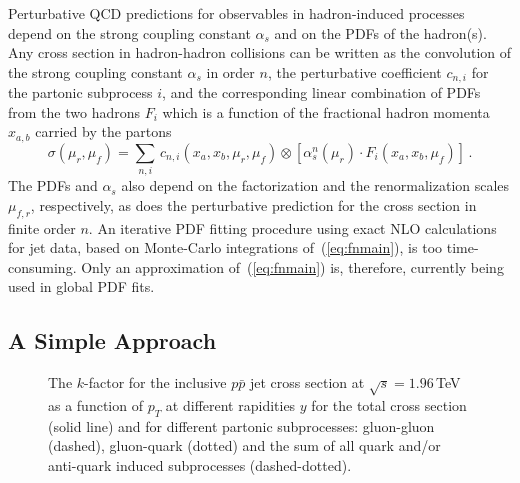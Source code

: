 Perturbative QCD predictions for observables in 
hadron-induced processes depend on the strong coupling 
constant $\alpha_s$ and on the PDFs of the hadron(s).
Any cross section in hadron-hadron collisions 
can be written as the convolution of 
the strong coupling constant  $\alpha_s$ in order $n$,
the perturbative coefficient $c_{n,i}$ for the partonic
subprocess $i$,
and the corresponding linear combination of PDFs 
from the two hadrons $F_i$
which is a function of the  fractional hadron momenta
$x_{a,b}$ carried by the partons
%
\begin{equation}
\sigma(\mu_r,\mu_f) = \sum_{n,i}  \, c_{n,i}(x_a, x_b, \mu_r,\mu_f) 
\otimes 
\left[ \alpha_s^n(\mu_r) \cdot F_i(x_a,x_b,\mu_f) \right] \,.
\label{eq:fnmain}
\end{equation}
%
The PDFs and $\alpha_s$ also depend on the factorization and the 
renormalization scales $\mu_{f,r}$, respectively,
as does the perturbative prediction for the cross section
in finite order $n$.
%
An iterative PDF fitting procedure
using exact NLO calculations for jet data, 
based on Monte-Carlo integrations of~(\ref{eq:fnmain}), 
is too time-consuming.
Only an approximation of~(\ref{eq:fnmain}) is, therefore,
currently being used in global PDF fits.





\subsection{A Simple Approach}


\begin{figure}[t]
\centerline{
}
   \caption{The $k$-factor for the inclusive $p\bar{p}$ jet cross section 
   at $\sqrt{s}=1.96$\,TeV as a function of $p_T$ at different rapidities $y$
   for the total cross section (solid line) and for different 
   partonic subprocesses:
   gluon-gluon (dashed), gluon-quark (dotted) and the sum of all
   quark and/or anti-quark induced subprocesses (dashed-dotted).
\label{fig:kfactor}}
\end{figure}



